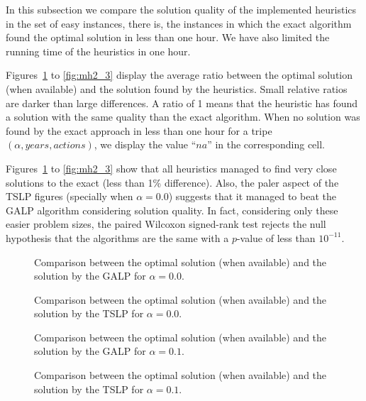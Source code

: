 In this subsection we compare the solution quality of the implemented heuristics
in the set of easy instances, there is, the instances in which the exact algorithm
found the optimal solution in less than one hour. We have also limited the running time
of the heuristics in one hour.

Figures~\ref{fig:mh1_1} to \ref{fig:mh2_3} display the average ratio between the optimal solution (when available) 
and the solution found by the heuristics. 
Small relative ratios are darker than large differences.
A ratio of 1 means that the heuristic has found a solution with the same quality
than the exact algorithm.
When no solution was found by the exact approach in less than one hour for 
a tripe $(\alpha, years, actions)$, we display the value ``$na$'' in
the corresponding cell.

Figures~\ref{fig:mh1_1} to \ref{fig:mh2_3} show that all heuristics managed
to find very close solutions to the exact (less than 1\% difference).
Also, the paler aspect of the TSLP figures (specially when $\alpha=0.0$) suggests that
it managed to beat the GALP algorithm considering solution quality.
In fact, considering only these easier problem sizes, the paired Wilcoxon signed-rank test \cite{japkowicz2011evaluating} rejects the null hypothesis
that the algorithms are the same with a $p$-value of less than $10^{-11}$.

\begin{figure}
\centering
\caption{Comparison between the optimal solution (when available) 
and the solution by the GALP for $\alpha=0.0$.}
\label{fig:mh1_1}
\end{figure}

\begin{figure}
\centering
\caption{Comparison between the optimal solution (when available) 
and the solution by the TSLP for $\alpha=0.0$.}
\label{fig:mh2_1}
\end{figure} 

\begin{figure}
\centering
\caption{Comparison between the optimal solution (when available) 
and the solution by the GALP for $\alpha=0.1$.}
\label{fig:mh1_2}
\end{figure}

\begin{figure}
\centering
\caption{Comparison between the optimal solution (when available) 
and the solution by the TSLP for $\alpha=0.1$.}
\label{fig:mh2_2}
\end{figure}
 
